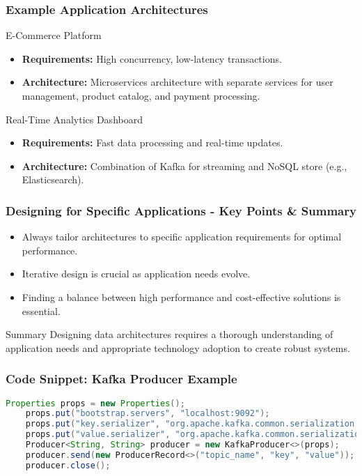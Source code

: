 \documentclass[aspectratio=169]{beamer}
\begin{document}
\begin{frame}[fragile]
    \frametitle{Example Application Architectures}
    \begin{block}{E-Commerce Platform}
        \begin{itemize}
            \item \textbf{Requirements:} High concurrency, low-latency transactions.
            \item \textbf{Architecture:} Microservices architecture with separate services for user management, product catalog, and payment processing.
        \end{itemize}
    \end{block}
    \begin{block}{Real-Time Analytics Dashboard}
        \begin{itemize}
            \item \textbf{Requirements:} Fast data processing and real-time updates.
            \item \textbf{Architecture:} Combination of Kafka for streaming and NoSQL store (e.g., Elasticsearch).
        \end{itemize}
    \end{block}
\end{frame}

\begin{frame}[fragile]
    \frametitle{Designing for Specific Applications - Key Points & Summary}
    \begin{itemize}
        \item Always tailor architectures to specific application requirements for optimal performance.
        \item Iterative design is crucial as application needs evolve.
        \item Finding a balance between high performance and cost-effective solutions is essential.
    \end{itemize}
    \begin{block}{Summary}
        Designing data architectures requires a thorough understanding of application needs and appropriate technology adoption to create robust systems.
    \end{block}
\end{frame}

\begin{frame}[fragile]
    \frametitle{Code Snippet: Kafka Producer Example}
    \begin{lstlisting}[language=java]
    Properties props = new Properties();
    props.put("bootstrap.servers", "localhost:9092");
    props.put("key.serializer", "org.apache.kafka.common.serialization.StringSerializer");
    props.put("value.serializer", "org.apache.kafka.common.serialization.StringSerializer");
    Producer<String, String> producer = new KafkaProducer<>(props);
    producer.send(new ProducerRecord<>("topic_name", "key", "value"));
    producer.close();
    \end{lstlisting}
\end{frame}
\end{document}
